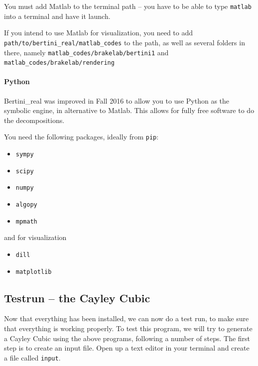 You must add Matlab to the terminal path -- you have to be able to type {\tt matlab} into a terminal and have it launch.  

If you intend to use Matlab for visualization, you need to add {\tt path/to/bertini\_real/matlab\_codes} to the path, as well as several folders in there, namely {\tt matlab\_codes/brakelab/bertini1} and {\tt matlab\_codes/brakelab/rendering}

\paragraph*{Python}

Bertini\_real was improved in Fall 2016 to allow you to use Python as the symbolic engine, in alternative to Matlab.  This allows for fully free software to do the decompositions.  

You need the following packages, ideally from {\tt pip}:
\begin{itemize}[noitemsep]
\item {\tt sympy}
\item {\tt scipy}
\item {\tt numpy}
\item {\tt algopy}
\item {\tt mpmath}
  \end{itemize}
and for visualization
\begin{itemize}[noitemsep]
\item {\tt dill}
\item {\tt matplotlib}
  \end{itemize}






\clearpage


\clearpage


\clearpage















\clearpage

\subsection{Testrun -- the Cayley Cubic}

Now that everything has been installed, we can now do a test run, to make sure that everything is working properly. To test this program, we will try to generate a Cayley Cubic using the above programs, following a number of steps. The first step is to create an input file. Open up a text editor in your terminal and create a file called \texttt{input}. 

